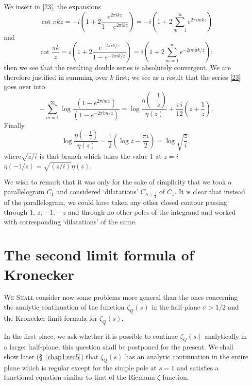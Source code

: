 We insert in \eqref{23}, the expansions
$$
\cot \pi kz=-i\left(1+2\frac{e^{2\pi ikz}}{1-e^{2\pi
    ikz}}\right)=-i\left(1+2\sum^{\infty}_{m=1}e^{2\pi imkz}\right)
$$
and
$$
\cot \frac{\pi k}{z}=i\left(1+2\frac{e^{-2\pi ik/z}}{1-e^{-2\pi
    ik/z}}\right)=i\left(1+2\sum^{\infty}_{m=1}e^{-2im\pi k/z}\right);
$$
then we see that the resulting double series is absolutely
convergent. We are therefore justified in summing over $k$ first; we
see as a result that the series \eqref{23} goes over into
$$
-\sum^{\infty}_{m=1}\log\frac{(1-e^{2\pi imz})}{(1-e^{-2\pi
    im/z})}=\log\frac{\eta\left(-\dfrac{1}{z}\right)}{\eta(z)}+\frac{\pi
  i}{12}\left(z+\frac{1}{z}\right).
$$
Finally
$$
\log\frac{\eta\left(-\frac{1}{z}\right)}{\eta(z)}=\frac{1}{2}\left(\log
z-\frac{\pi i}{2}\right)=\log\sqrt{\frac{z}{i}},
$$
where\pageoriginale $\sqrt{z/i}$ is that branch which takes the value
$1$ at $z=i$ \ie $\eta(-1/z)=\sqrt{(z/i)}\eta(z)$.

We wish to remark that it was only for the sake of simplicity that we
took a parallelogram $C_{1}$ and considered `dilatations'
$C_{h+\frac{1}{2}}$ of $C_{1}$. It is clear that instead of the
parallelogram, we could have taken any other closed contour passing
through $1$, $z$, $-1$, $-z$ and through no other poles of the
integrand and worked with corresponding `dilatations' of the same.

\section{The second limit formula of Kronecker}\label{chap1:sec3}

\textsc{We Shall} consider now some problems more general than the
ones concerning the analytic continuation of the function
$\zeta_{Q}(s)$ in the half-plane $\sigma>1/2$ and the Kronecker limit
formula for $\zeta_{Q}(s)$.

In the first place, we ask whether it is possible to continue
$\zeta_{Q}(s)$ analytically in a larger half-plane; this question
shall be postponed for the present. We shall show later
(\S\ \ref{chap1:sec5}) that $\zeta_{Q}(s)$ has an analytic continuation in
the entire plane which is regular except for the simple pole at $s=1$
and satisfies a functional equation similar to that of the Riemann
$\zeta$-function.

